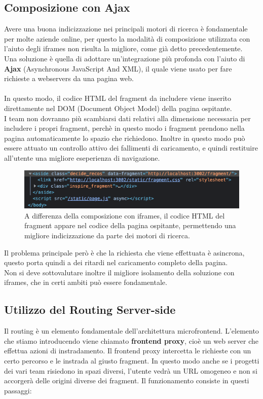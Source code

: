 \subsection{Composizione con Ajax}
Avere una buona indicizzazione nei principali motori di ricerca è fondamentale per molte aziende online, per questo la modalità di 
composizione utilizzata con l'aiuto degli iframes non risulta la migliore, come già detto precedentemente.
\\Una soluzione è quella di adottare un'integrazione più profonda con l'aiuto di \textbf{Ajax} (Asynchronous JavaScript And XML),
il quale viene usato per fare richieste a webservers da una pagina web.
\\\\
In questo modo, il codice HTML del fragment da includere viene inserito direttamente nel DOM (Document Object Model) della pagina ospitante.
\\
I team non dovranno più scambiarsi dati relativi alla dimensione necessaria per includere i propri fragment, perchè in questo modo
i fragment prendono nella pagina automaticamente lo spazio che richiedono. Inoltre in questo modo può essere attuato un controllo attivo 
dei fallimenti di caricamento, e quindi restituire all'utente una migliore eseperienza di navigazione.
\begin{figure}[H]
    \centering
    \includegraphics[width=140mm]{img/ajax}
    \caption{A differenza della composizione con iframes, il codice HTML del fragment appare nel codice della pagina ospitante, permettendo una migliore
    indicizzazione da parte dei motori di ricerca.}
  \end{figure}

Il problema principale però è che la richiesta che viene effettuata è asincrona, questo porta quindi a dei ritardi nel caricamento completo della pagina.
\\
Non si deve sottovalutare inoltre il migliore isolamento della soluzione con iframes, che in certi ambiti può essere fondamentale.

\subsection{Utilizzo del Routing Server-side}
Il routing è un elemento fondamentale dell’architettura microfrontend.
L’elemento che stiamo introducendo viene chiamato \textbf{frontend proxy}, cioè un web server che effettua azioni di instradamento.
 Il frontend proxy intercetta le richieste con un certo percorso e le instrada al giusto fragment. In questo modo anche se
  i progetti dei vari team risiedono in spazi diversi, l’utente vedrà un URL omogeneo e non si accorgerà delle origini diverse dei fragment.
Il funzionamento consiste in questi passaggi:

